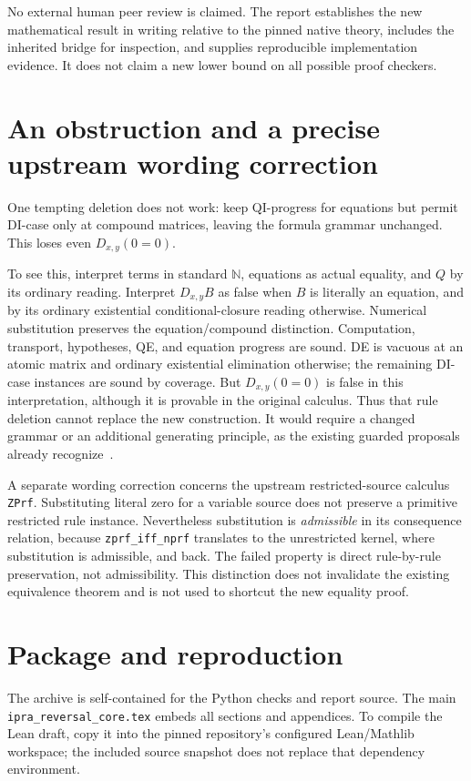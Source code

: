 \documentclass[11pt,letterpaper]{article}
\theoremstyle{definition}\newtheorem{definition}[theorem]{Definition}
\theoremstyle{remark}\newtheorem{remark}[theorem]{Remark}
\newcommand{\code}[1]{{\small\nolinkurl{#1}}}
\begin{document}
No external human peer review is claimed. The report establishes the
new mathematical result in writing relative to the pinned native
theory, includes the inherited bridge for inspection, and supplies
reproducible implementation evidence. It does not claim a new lower
bound on all possible proof checkers.

\section{An obstruction and a precise upstream wording correction}
\label{sec:limits}

One tempting deletion does not work: keep QI-progress for equations
but permit DI-case only at compound matrices, leaving the formula
grammar unchanged. This loses even $D_{x,y}(0=0)$.

To see this, interpret terms in standard $\mathbb N$, equations as
actual equality, and $Q$ by its ordinary reading. Interpret $D_{x,y}B$
as false when $B$ is literally an equation, and by its ordinary
existential conditional-closure reading otherwise. Numerical
substitution preserves the equation/compound distinction. Computation,
transport, hypotheses, QE, and equation progress are sound. DE is
vacuous at an atomic matrix and ordinary existential elimination
otherwise; the remaining DI-case instances are sound by coverage.
But $D_{x,y}(0=0)$ is false in this interpretation, although it is
provable in the original calculus. Thus that rule deletion cannot
replace the new construction. It would require a changed grammar or
an additional generating principle, as the existing guarded proposals
already recognize~\cite{guarded}.

A separate wording correction concerns the upstream restricted-source
calculus \code{ZPrf}. Substituting literal zero for a variable source
does not preserve a primitive restricted rule instance. Nevertheless
substitution is \emph{admissible} in its consequence relation, because
\code{zprf_iff_nprf} translates to the unrestricted kernel, where
substitution is admissible, and back. The failed property is direct
rule-by-rule preservation, not admissibility. This distinction does not
invalidate the existing equivalence theorem and is not used to shortcut
the new equality proof.

\section{Package and reproduction}

The archive is self-contained for the Python checks and report source.
The main \code{ipra_reversal_core.tex} embeds all sections and appendices.
To compile the Lean draft, copy it into the pinned repository's configured
Lean/Mathlib workspace; the included source snapshot does not replace
that dependency environment.
\end{document}
